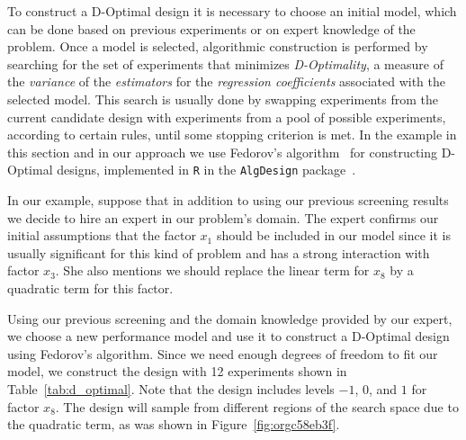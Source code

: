 \documentclass[conference]{IEEEtran}
\begin{document}
To construct a D-Optimal design it is necessary to choose an initial model,
which can be done based on previous experiments or on expert knowledge of the
problem. Once a model is selected, algorithmic construction is performed by
searching for the set of experiments that minimizes \emph{D-Optimality}, a measure of
the \emph{variance} of the \emph{estimators} for the \emph{regression coefficients} associated
with the selected model. This search is usually done by swapping experiments
from the current candidate design with experiments from a pool of possible
experiments, according to certain rules, until some stopping criterion is met.
In the example in this section and in our approach we use Fedorov's
algorithm~\cite{fedorov1972theory} for constructing D-Optimal designs,
implemented in \texttt{R} in the \texttt{AlgDesign} package~\cite{wheeler2014algdesign}.

In our example, suppose that in addition to using our previous screening results
we decide to hire an expert in our problem's domain. The expert confirms our
initial assumptions that the factor \(x_1\) should be included in our model since
it is usually significant for this kind of problem and has a strong interaction
with factor \(x_3\). She also mentions we should replace the linear term for \(x_8\)
by a quadratic term for this factor.

Using our previous screening and the domain knowledge provided by our expert, we
choose a new performance model and use it to construct a D-Optimal design using
Fedorov's algorithm. Since we need enough degrees of freedom to fit our model,
we construct the design with 12 experiments shown in Table~\ref{tab:d_optimal}.
Note that the design includes levels \(-1\), \(0\), and \(1\) for factor \(x_8\). The design
will sample from different regions of the search space due to the quadratic term,
as was shown in Figure~\ref{fig:orgc58eb3f}.
\end{document}
